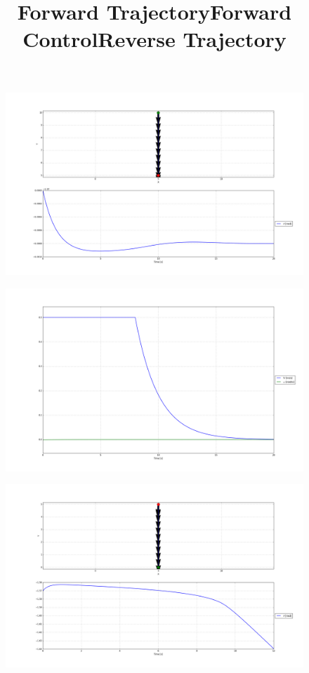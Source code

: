 \documentclass[12pt]{article}
\begin{document}
\begin{enumerate}
	\begin{figure}[H]
		\centering
		\title{\bf Forward Trajectory}
		\includegraphics[width=\textwidth]{../Figures/hw1_3_ii_a_forward.png}
	\end{figure}
	\begin{figure}[H]
		\centering
		\title{\bf Forward Control}
		\includegraphics[width=\textwidth]{../Figures/hw1_3_ii_b_forward.png}
	\end{figure}
	\begin{figure}[H]
		\centering
		\title{\bf Reverse Trajectory}
		\includegraphics[width=\textwidth]{../Figures/hw1_3_ii_a_reverse.png}

\end{figure}
\end{enumerate}
\end{document}
